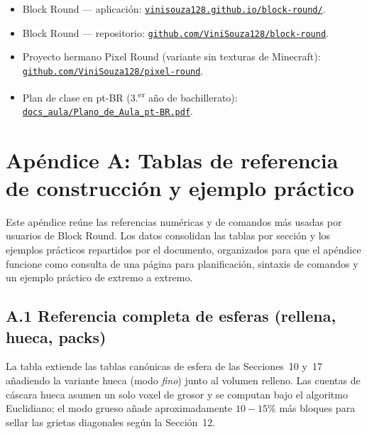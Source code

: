 \documentclass[12pt,a4paper]{scrartcl}
\newcommand{\biblink}[2]{\href{#1}{\nolinkurl{#2}}}
\begin{document}
\begin{itemize}[leftmargin=1.4em,itemsep=0.3em,topsep=0.3em]
  \item Block Round --- aplicación: \biblink{https://vinisouza128.github.io/block-round/}{vinisouza128.github.io/block-round/}.
  \item Block Round --- repositorio: \biblink{https://github.com/ViniSouza128/block-round}{github.com/ViniSouza128/block-round}.
  \item Proyecto hermano Pixel Round (variante sin texturas de Minecraft):
        \biblink{https://github.com/ViniSouza128/pixel-round}{github.com/ViniSouza128/pixel-round}.
  \item Plan de clase en pt-BR (3.\textsuperscript{er} año de bachillerato):
        \biblink{https://vinisouza128.github.io/block-round/docs_aula/Plano_de_Aula_pt-BR.pdf}{docs\_aula/Plano\_de\_Aula\_pt-BR.pdf}.
\end{itemize}


\clearpage

\section*{\color{accent}Apéndice A: Tablas de referencia de construcción y ejemplo práctico}

Este apéndice reúne las referencias numéricas y de comandos más usadas por usuarios de Block Round. Los datos consolidan las tablas por sección y los ejemplos prácticos repartidos por el documento, organizados para que el apéndice funcione como consulta de una página para planificación, sintaxis de comandos y un ejemplo práctico de extremo a extremo.

\subsection*{A.1 Referencia completa de esferas (rellena, hueca, packs)}
La tabla extiende las tablas canónicas de esfera de las Secciones~10 y~17 añadiendo la variante hueca (modo \emph{fino}) junto al volumen relleno. Las cuentas de cáscara hueca asumen un solo voxel de grosor y se computan bajo el algoritmo Euclidiano; el modo grueso añade aproximadamente $10{-}15\%$ más bloques para sellar las grietas diagonales según la Sección~12.
\end{document}
